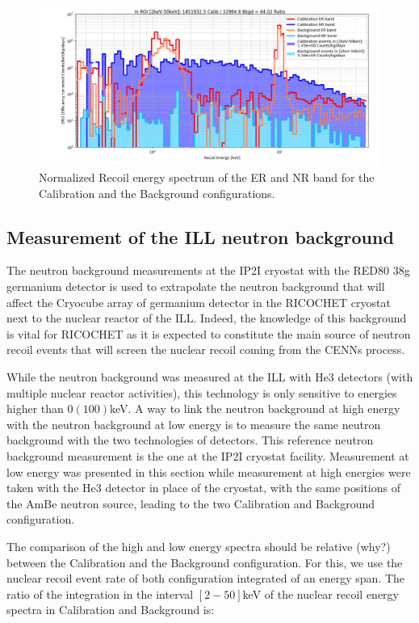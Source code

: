 \begin{figure}
\centering
\includegraphics[width=\linewidth,]{Figures/Neutron/background_measurements.png}
\caption{Normalized Recoil energy spectrum of the ER and NR band for the Calibration and the Background configurations.}
\label{fig:background-measurements}
\end{figure}


\subsection{Measurement of the ILL neutron background}

The neutron background measurements at the IP2I cryostat with the RED80 38g germanium detector is used to extrapolate the neutron background that will affect the Cryocube array of germanium detector in the RICOCHET cryostat next to the nuclear reactor of the ILL. Indeed, the knowledge of this background is vital for RICOCHET as it is expected to constitute the main source of neutron recoil events that will screen the nuclear recoil coming from the CENNs process.

While the neutron background was measured at the ILL with He3 detectors (with multiple nuclear reactor activities), this technology is only sensitive to energies higher than $\mathcal{0}(100)$keV. A way to link the neutron background at high energy with the neutron background at low energy is to measure the same neutron background with the two technologies of detectors.
This reference neutron background measurement is the one at the IP2I cryostat facility. Measurement at low energy was presented in this section while measurement at high energies were taken with the He3 detector in place of the cryostat, with the same positions of the AmBe neutron source, leading to the two Calibration and Background configuration.

The comparison of the high and low energy spectra should be relative (why?) between the Calibration and the Background configuration. For this, we use the nuclear recoil event rate of both configuration integrated of an energy span. The ratio of the integration in the interval $[2-50]$keV of the nuclear recoil energy spectra in Calibration and Background is:

